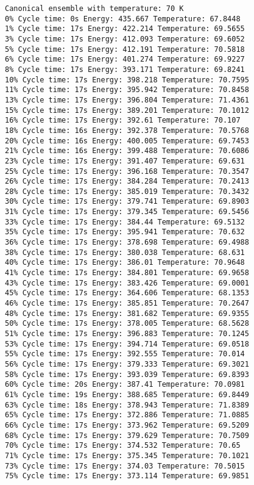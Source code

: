 \documentclass{article}
\begin{document}
\begin{verbatim}
Canonical ensemble with temperature: 70 K
0% Cycle time: 0s Energy: 435.667 Temperature: 67.8448
1% Cycle time: 17s Energy: 422.214 Temperature: 69.5655
3% Cycle time: 17s Energy: 412.093 Temperature: 69.6052
5% Cycle time: 17s Energy: 412.191 Temperature: 70.5818
6% Cycle time: 17s Energy: 401.274 Temperature: 69.9227
8% Cycle time: 17s Energy: 393.171 Temperature: 69.8241
10% Cycle time: 17s Energy: 398.218 Temperature: 70.7595
11% Cycle time: 17s Energy: 395.942 Temperature: 70.8458
13% Cycle time: 17s Energy: 396.804 Temperature: 71.4361
15% Cycle time: 17s Energy: 389.201 Temperature: 70.1012
16% Cycle time: 17s Energy: 392.61 Temperature: 70.107
18% Cycle time: 16s Energy: 392.378 Temperature: 70.5768
20% Cycle time: 16s Energy: 400.005 Temperature: 69.7453
21% Cycle time: 16s Energy: 399.488 Temperature: 70.6086
23% Cycle time: 17s Energy: 391.407 Temperature: 69.631
25% Cycle time: 17s Energy: 396.168 Temperature: 70.3547
26% Cycle time: 17s Energy: 384.284 Temperature: 70.2413
28% Cycle time: 17s Energy: 385.019 Temperature: 70.3432
30% Cycle time: 17s Energy: 379.741 Temperature: 69.8903
31% Cycle time: 17s Energy: 379.345 Temperature: 69.5456
33% Cycle time: 17s Energy: 384.44 Temperature: 69.5132
35% Cycle time: 17s Energy: 395.941 Temperature: 70.632
36% Cycle time: 17s Energy: 378.698 Temperature: 69.4988
38% Cycle time: 17s Energy: 380.038 Temperature: 68.631
40% Cycle time: 17s Energy: 386.01 Temperature: 70.9648
41% Cycle time: 17s Energy: 384.801 Temperature: 69.9658
43% Cycle time: 17s Energy: 383.426 Temperature: 69.0001
45% Cycle time: 17s Energy: 364.606 Temperature: 68.1353
46% Cycle time: 17s Energy: 385.851 Temperature: 70.2647
48% Cycle time: 17s Energy: 381.682 Temperature: 69.9355
50% Cycle time: 17s Energy: 378.005 Temperature: 68.5628
51% Cycle time: 17s Energy: 396.883 Temperature: 70.1245
53% Cycle time: 17s Energy: 394.714 Temperature: 69.0518
55% Cycle time: 17s Energy: 392.555 Temperature: 70.014
56% Cycle time: 17s Energy: 379.333 Temperature: 69.3021
58% Cycle time: 17s Energy: 393.039 Temperature: 69.8393
60% Cycle time: 20s Energy: 387.41 Temperature: 70.0981
61% Cycle time: 19s Energy: 388.685 Temperature: 69.8449
63% Cycle time: 18s Energy: 378.943 Temperature: 71.8389
65% Cycle time: 17s Energy: 372.886 Temperature: 71.0885
66% Cycle time: 17s Energy: 373.962 Temperature: 69.5209
68% Cycle time: 17s Energy: 379.629 Temperature: 70.7509
70% Cycle time: 17s Energy: 374.532 Temperature: 70.65
71% Cycle time: 17s Energy: 375.345 Temperature: 70.1021
73% Cycle time: 17s Energy: 374.03 Temperature: 70.5015
75% Cycle time: 17s Energy: 373.114 Temperature: 69.9851

\end{verbatim}
\end{document}

